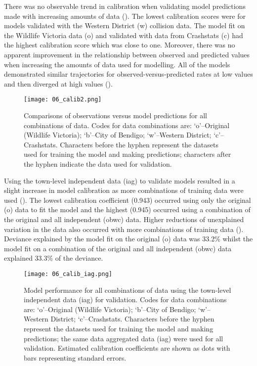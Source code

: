 There was no observable trend in calibration when validating model predictions made with increasing amounts of data (). The lowest calibration scores were for models validated with the Western District (w) collision data. The model fit on the Wildlife Victoria data (o) and validated with data from Crashstats (c) had the highest calibration score which was close to one. Moreover, there was no apparent improvement in the relationship between observed and predicted values when increasing the amounts of data used for modelling. All of the models demonstrated similar trajectories for observed-versus-predicted rates at low values and then diverged at high values ().

\begin{figure*}[!t]
  \centering
  \texttt{[image: 06\_calib2.png]}
  \caption[Comparisons of observations versus model predictions for all combinations of original and independent data]{Comparisons of observations versus model predictions for all combinations of data. Codes for data combinations are: `o'--Original (Wildlife Victoria); `b'--City of Bendigo; `w'--Western District; `c'--Crashstats. Characters before the hyphen represent the datasets used for training the model and making predictions; characters after the hyphen indicate the data used for validation.}
  \label{val_calib2}
\end{figure*}

Using the town-level independent data (iag) to validate models resulted in a slight increase in model calibration as more combinations of training data were used ().  The lowest calibration coefficient (0.943) occurred using only the original (o) data to fit the model and the highest (0.945) occurred using a combination of the original and all independent (obwc) data. Higher reductions of unexplained variation in the data also occurred with more combinations of training data (). Deviance explained by the model fit on the original (o) data was 33.2\% whilst the model fit on a combination of the original and all independent (obwc) data explained 33.3\% of the deviance.

\begin{figure*}[!t]
  \centering
  \texttt{[image: 06\_calib\_iag.png]}
  \caption[Model calibration for all combinations of training data using the town-level independent data for validation]{Model performance for all combinations of data using the town-level independent data (iag) for validation. Codes for data combinations are: `o'--Original (Wildlife Victoria); `b'--City of Bendigo; `w'--Western District; `c'--Crashstats. Characters before the hyphen represent the datasets used for training the model and making predictions; the same data aggregated data (iag) were used for all validation. Estimated calibration coefficients are shown as dots with bars representing standard errors.}
  \label{val_calib_iag}
\end{figure*}


